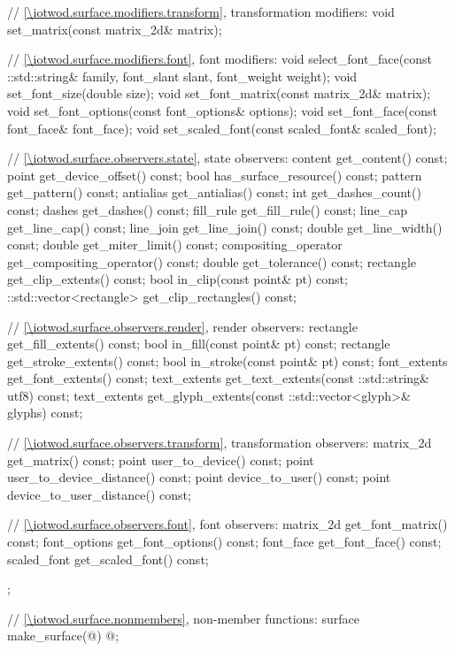 \begin{codeblock}
{{{{{    // \ref{\iotwod.surface.modifiers.transform}, transformation modifiers:
    void set_matrix(const matrix_2d& matrix);

    // \ref{\iotwod.surface.modifiers.font}, font modifiers:
    void select_font_face(const ::std::string& family, font_slant slant, 
      font_weight weight);
    void set_font_size(double size);
    void set_font_matrix(const matrix_2d& matrix);
    void set_font_options(const font_options& options);
    void set_font_face(const font_face& font_face);
    void set_scaled_font(const scaled_font& scaled_font);

    // \ref{\iotwod.surface.observers.state}, state observers:
    content get_content() const;
    point get_device_offset() const;
    bool has_surface_resource() const;
    pattern get_pattern() const;
    antialias get_antialias() const;
    int get_dashes_count() const;
    dashes get_dashes() const;
    fill_rule get_fill_rule() const;
    line_cap get_line_cap() const;
    line_join get_line_join() const;
    double get_line_width() const;
    double get_miter_limit() const;
    compositing_operator get_compositing_operator() const;
    double get_tolerance() const;
    rectangle get_clip_extents() const;
    bool in_clip(const point& pt) const;
    ::std::vector<rectangle> get_clip_rectangles() const;

    // \ref{\iotwod.surface.observers.render}, render observers:
    rectangle get_fill_extents() const;
    bool in_fill(const point& pt) const;
    rectangle get_stroke_extents() const;
    bool in_stroke(const point& pt) const;
    font_extents get_font_extents() const;
    text_extents get_text_extents(const ::std::string& utf8) const;
    text_extents get_glyph_extents(const ::std::vector<glyph>& glyphs) const;

    // \ref{\iotwod.surface.observers.transform}, transformation observers:
    matrix_2d get_matrix() const;
    point user_to_device() const;
    point user_to_device_distance() const;
    point device_to_user() const;
    point device_to_user_distance() const;

    // \ref{\iotwod.surface.observers.font}, font observers:
    matrix_2d get_font_matrix() const;
    font_options get_font_options() const;
    font_face get_font_face() const;
    scaled_font get_scaled_font() const;
  };
  
  // \ref{\iotwod.surface.nonmembers}, non-member functions:
  surface make_surface(@\impdef@) @\impdef@;
} } } }
\end{codeblock}


